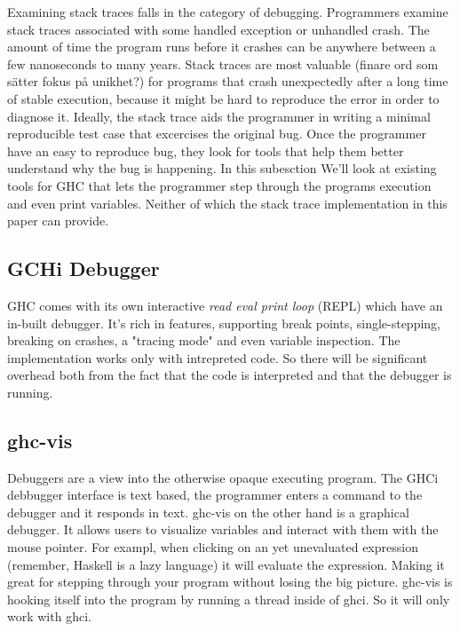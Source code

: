 Examining stack traces falls in the category of debugging. Programmers examine
stack traces associated with some handled exception or unhandled crash. The
amount of time the program runs before it crashes can be anywhere between a few
nanoseconds to many years. Stack traces are most valuable (finare ord som
sätter fokus på unikhet?) for programs that crash unexpectedly after a long
time of stable execution, because it might be hard to reproduce the error in
order to diagnose it. Ideally, the stack trace aids the programmer in writing a
minimal reproducible test case that excercises the original bug.  Once
the programmer have an easy to reproduce bug, they look for tools that help them
better understand why the bug is happening.  In this subesction We'll look at
existing tools for GHC that lets the programmer step through the programs
execution and even print variables. Neither of which the stack trace
implementation in this paper can provide.

\subsection{GCHi Debugger}

GHC comes with its own interactive \emph{read eval print loop} (REPL)
which have an in-built debugger. It's rich in features, supporting break
points, single-stepping, breaking on crashes, a "tracing mode" and even
variable inspection. The implementation works only with intrepreted
code. \cite{ghci_debugger} So there will be significant overhead both
from the fact that the code is interpreted and that the debugger is
running.


\subsection{ghc-vis}

Debuggers are a view into the otherwise opaque executing program. The
GHCi debbugger interface is text based, the programmer enters a command
to the debugger and it responds in text.  ghc-vis on the other hand is a
graphical debugger.  It allows users to visualize variables and interact
with them with the mouse pointer. For exampl, when clicking on an yet
unevaluated expression (remember, Haskell is a lazy language) it will
evaluate the expression.  Making it great for stepping through your
program without losing the big picture.  ghc-vis is hooking itself into
the program by running a thread inside of ghci. So it will only work
with ghci.  \cite{thesisFelsingBA}


